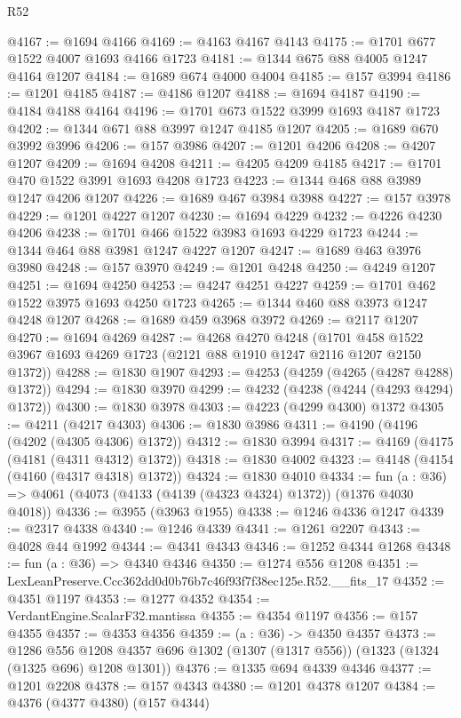 \begin{lexlean}{R52}
\begin{coremodule}
@4167 := @1694 @4166
@4169 := @4163 @4167 @4143
@4175 := @1701 @677 @1522 @4007 @1693 @4166 @1723
@4181 := @1344 @675 @88 @4005 @1247 @4164 @1207
@4184 := @1689 @674 @4000 @4004
@4185 := @157 @3994
@4186 := @1201 @4185
@4187 := @4186 @1207
@4188 := @1694 @4187
@4190 := @4184 @4188 @4164
@4196 := @1701 @673 @1522 @3999 @1693 @4187 @1723
@4202 := @1344 @671 @88 @3997 @1247 @4185 @1207
@4205 := @1689 @670 @3992 @3996
@4206 := @157 @3986
@4207 := @1201 @4206
@4208 := @4207 @1207
@4209 := @1694 @4208
@4211 := @4205 @4209 @4185
@4217 := @1701 @470 @1522 @3991 @1693 @4208 @1723
@4223 := @1344 @468 @88 @3989 @1247 @4206 @1207
@4226 := @1689 @467 @3984 @3988
@4227 := @157 @3978
@4229 := @1201 @4227 @1207
@4230 := @1694 @4229
@4232 := @4226 @4230 @4206
@4238 := @1701 @466 @1522 @3983 @1693 @4229 @1723
@4244 := @1344 @464 @88 @3981 @1247 @4227 @1207
@4247 := @1689 @463 @3976 @3980
@4248 := @157 @3970
@4249 := @1201 @4248
@4250 := @4249 @1207
@4251 := @1694 @4250
@4253 := @4247 @4251 @4227
@4259 := @1701 @462 @1522 @3975 @1693 @4250 @1723
@4265 := @1344 @460 @88 @3973 @1247 @4248 @1207
@4268 := @1689 @459 @3968 @3972
@4269 := @2117 @1207
@4270 := @1694 @4269
@4287 := @4268
    @4270
    @4248
    (@1701 @458 @1522 @3967 @1693 @4269 @1723 (@2121 @88 @1910 @1247 @2116 @1207 @2150 @1372))
@4288 := @1830 @1907
@4293 := @4253 (@4259 (@4265 (@4287 @4288) @1372))
@4294 := @1830 @3970
@4299 := @4232 (@4238 (@4244 (@4293 @4294) @1372))
@4300 := @1830 @3978
@4303 := @4223 (@4299 @4300) @1372
@4305 := @4211 (@4217 @4303)
@4306 := @1830 @3986
@4311 := @4190 (@4196 (@4202 (@4305 @4306) @1372))
@4312 := @1830 @3994
@4317 := @4169 (@4175 (@4181 (@4311 @4312) @1372))
@4318 := @1830 @4002
@4323 := @4148 (@4154 (@4160 (@4317 @4318) @1372))
@4324 := @1830 @4010
@4334 := fun (a : @36) => @4061 (@4073 (@4133 (@4139 (@4323 @4324) @1372)) (@1376 @4030 @4018))
@4336 := @3955 (@3963 @1955)
@4338 := @1246 @4336 @1247
@4339 := @2317 @4338
@4340 := @1246 @4339
@4341 := @1261 @2207
@4343 := @4028 @44 @1992
@4344 := @4341 @4343
@4346 := @1252 @4344 @1268
@4348 := fun (a : @36) => @4340 @4346
@4350 := @1274 @556 @1208
@4351 := LexLeanPreserve.Ccc362dd0d0b76b7c46f93f7f38ec125e.R52.__fits_17
@4352 := @4351 @1197
@4353 := @1277 @4352
@4354 := VerdantEngine.ScalarF32.mantissa
@4355 := @4354 @1197
@4356 := @157 @4355
@4357 := @4353 @4356
@4359 := (a : @36) -> @4350 @4357
@4373 := @1286
    @556
    @1208
    @4357
    @696
    @1302
    (@1307 (@1317 @556))
    (@1323 (@1324 (@1325 @696) @1208 @1301))
@4376 := @1335 @694 @4339 @4346
@4377 := @1201 @2208
@4378 := @157 @4343
@4380 := @1201 @4378 @1207
@4384 := @4376 (@4377 @4380) (@157 @4344)

\end{coremodule}
\end{lexlean}
